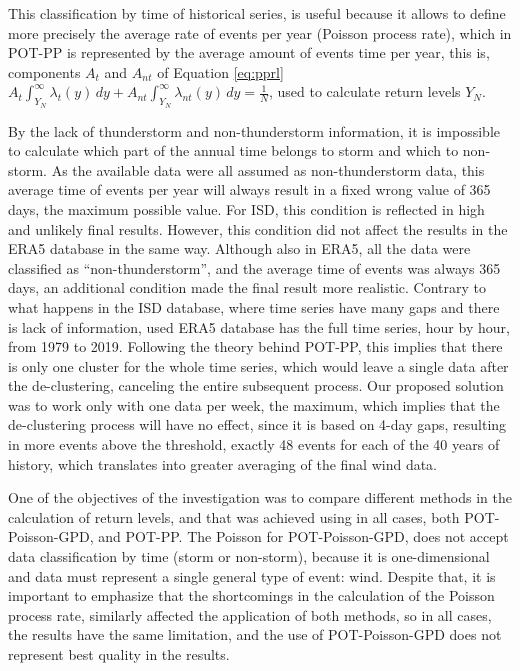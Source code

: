 \documentclass[12pt,twoside]{reedthesis}
\begin{document}
This classification by time of historical series, is useful because it allows to define more precisely the average rate of events per year (Poisson process rate), which in POT-PP is represented by the average amount of events time per year, this is, components \(A_t\) and \(A_{nt}\) of Equation \eqref{eq:pprl} \(A_t\int_{Y_N}^{\infty}\lambda_t\left( y\right)\,dy + A_{nt}\int_{Y_N}^{\infty}\lambda_{nt}\left( y\right)\,dy = \frac{1}{N}\), used to calculate return levels \(Y_N\).

By the lack of thunderstorm and non-thunderstorm information, it is impossible to calculate which part of the annual time belongs to storm and which to non-storm. As the available data were all assumed as non-thunderstorm data, this average time of events per year will always result in a fixed wrong value of 365 days, the maximum possible value. For ISD, this condition is reflected in high and unlikely final results. However, this condition did not affect the results in the ERA5 database in the same way. Although also in ERA5, all the data were classified as ``non-thunderstorm'', and the average time of events was always 365 days, an additional condition made the final result more realistic. Contrary to what happens in the ISD database, where time series have many gaps and there is lack of information, used ERA5 database has the full time series, hour by hour, from 1979 to 2019. Following the theory behind POT-PP, this implies that there is only one cluster for the whole time series, which would leave a single data after the de-clustering, canceling the entire subsequent process. Our proposed solution was to work only with one data per week, the maximum, which implies that the de-clustering process will have no effect, since it is based on 4-day gaps, resulting in more events above the threshold, exactly 48 events for each of the 40 years of history, which translates into greater averaging of the final wind data.

One of the objectives of the investigation was to compare different methods in the calculation of return levels, and that was achieved using in all cases, both POT-Poisson-GPD, and POT-PP. The Poisson for POT-Poisson-GPD, does not accept data classification by time (storm or non-storm), because it is one-dimensional and data must represent a single general type of event: wind. Despite that, it is important to emphasize that the shortcomings in the calculation of the Poisson process rate, similarly affected the application of both methods, so in all cases, the results have the same limitation, and the use of POT-Poisson-GPD does not represent best quality in the results.
\end{document}
